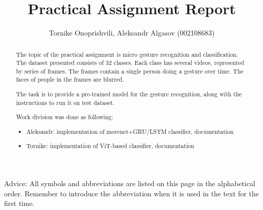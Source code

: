 \documentclass{lutmscthesis}[2017/10/03]
\title{Practical Assignment Report}
\author{Tornike Onoprishvili, Aleksandr Algasov (002108683)}
\begin{document}

\maketitle
\newpage

\begin{abstract}

The topic of the practical assignment is micro gesture recognition and classification. The dataset presented consists of 32 classes. Each class has several videos, represented by series of frames. The frames contain a single person doing a gesture over time. The faces of people in the frames are blurred.

The task is to provide a pre-trained model for the gesture recognition, along with the instructions to run it on test dataset.

Work division was done as following:

\begin{itemize}
    \item Aleksandr: implementation of movenet+GRU/LSTM classifier, documentation
    \item Tornike: implementation of ViT-based classifier, documentation
\end{itemize}

\end{abstract}




\renewcommand\refname{REFERENCES}
\renewcommand\contentsname{CONTENTS}

\pagestyle{masters}
\newpage



\tableofcontents



\glsnogroupskiptrue
\setlength{\glsdescwidth}{1.0\hsize}
\printglossary[title=LIST OF ABBREVIATIONS,type=\acronymtype, style=long, nonumberlist, nopostdot]

Advice: All symbols and abbreviations are listed on this page in the alphabetical order. 
Remember to introduce the abbreviation when it is used in the text for the first time.\\
\end{document}
